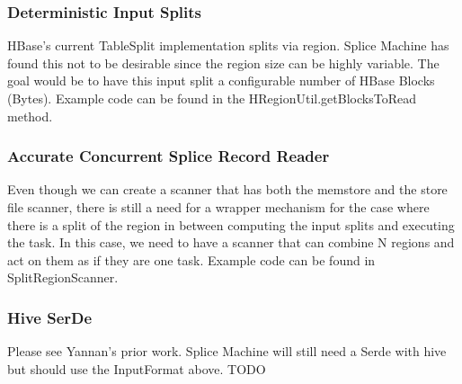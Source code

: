 \subsubsection{Deterministic Input Splits}
HBase's current TableSplit implementation splits via region.  Splice Machine has
found this not to be desirable since the region size can be highly variable. 
The goal would be to have this input split a configurable number of HBase
Blocks (Bytes).  Example code can be found in the HRegionUtil.getBlocksToRead
method.

\subsubsection{Accurate Concurrent Splice Record Reader}
Even though we can create a scanner that has both the memstore and the store
file scanner, there is still a need for a wrapper mechanism for the case where
there is a split of the region in between computing the input splits and executing the
task.  In this case, we need to have a scanner that can combine N regions and
act on them as if they are one task.  Example code can be found in
SplitRegionScanner.

\subsubsection{Hive SerDe}

Please see Yannan's prior work.  Splice Machine will still need a Serde with
hive but should use the InputFormat above.  TODO


